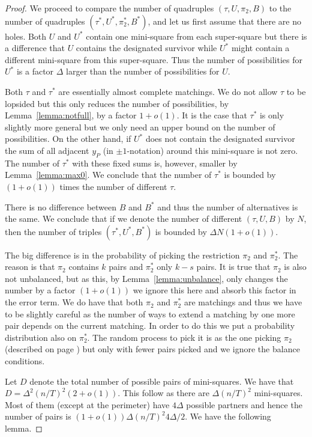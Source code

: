 \documentclass{article}\usepackage[a4paper,margin=20mm]{geometry}
\begin{document}
\begin{proof}
We proceed to compare the number of quadruples 
$(\tau, U, \pi_2, B)$ to the number of quadruples
$(\tau^*, U^*, \pi_2^*, B^*)$, and let us first assume that there
are no holes.  Both $U$ and 
$U^*$ contain one mini-square from each super-square but
there is a difference that $U$ contains the designated
survivor while $U^*$ might contain a different mini-square
from this super-square.  Thus the number of possibilities
for $U^*$ is a factor $\Delta$ larger than the
number of possibilities for $U$.

Both $\tau$ and $\tau^*$ are essentially almost complete matchings.
We do not allow $\tau$ to be lopsided but this only reduces
the number of possibilities, by Lemma~\ref{lemma:notfull},
by a factor $1+o(1)$.  It is the case that $\tau^*$
is only slightly more general but we only need
an upper bound on the number of possibilities.
On the other hand, if $U^*$ does not contain the designated
survivor the
sum of all adjacent $y_P$ (in $\pm 1$-notation)
around this mini-square is not zero.  
The number of $\tau^*$ with
these fixed sums is, however, smaller by Lemma~\ref{lemma:max0}.
We conclude that the number of $\tau^*$ is bounded by
$(1+o(1))$ times the number of different $\tau$.

There is no difference between $B$ and $B^*$ and
thus the number of alternatives is the same.
We conclude that if we denote the number of different 
$(\tau, U,B)$ by $N$, then the number of triples
$(\tau^*, U^*,B^*)$ is bounded by $\Delta N (1+o(1))$.

The big difference is in the probability of picking the restriction
 $\pi_2$ and $\pi_2^*$.  The reason is that $\pi_2$ contains $k$
pairs and $\pi_2^*$ only $k-s$ pairs.
It is true that $\pi_2$ is also not unbalanced,
but as this, by Lemma~\ref{lemma:unbalance},
only changes the number by a factor $(1+o(1))$ we ignore
this here and absorb this factor in the error term.   We do have
that both $\pi_2$ and $\pi_2^*$
are matchings and thus we have to be slightly
careful as the number of ways to extend a matching
by one more pair depends on the current matching.
In order to do this we put a probability distribution
also on $\pi_2^*$.   The random process to pick it is
as the one picking $\pi_2$ (described on page \pageref{distribution})
but only with fewer pairs picked and we ignore the balance
conditions.

Let $D$ denote the total number of
possible pairs of mini-squares.  We have that $D= \Delta^2 (n/T)^2 (2+o(1))$.
This follow as there are $\Delta (n/T)^2$ mini-squares. Most of
them (except at the perimeter) have $4 \Delta$ possible partners
and hence the number of pairs is $(1+o(1))\Delta (n/T)^2 4 \Delta/2$.
We have the following lemma.


\end{proof}
\end{document}
